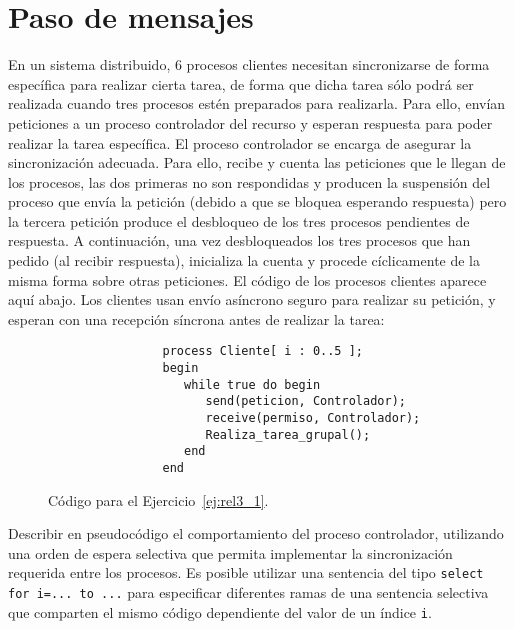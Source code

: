 \section{Paso de mensajes}

\begin{ejercicio}\label{ej:rel3_1}
    En un sistema distribuido, 6 procesos clientes necesitan sincronizarse de forma específica para realizar cierta tarea, de forma que dicha tarea sólo podrá ser realizada cuando tres procesos estén preparados para realizarla. Para ello, envían peticiones a un proceso controlador del recurso y esperan respuesta para poder realizar la tarea específica. El proceso controlador se encarga de asegurar la sincronización adecuada. Para ello, recibe y cuenta las peticiones que le llegan de los procesos, las dos primeras no son respondidas y producen la suspensión del proceso que envía la petición (debido a que se bloquea esperando respuesta) pero la tercera petición produce el desbloqueo de los tres procesos pendientes de respuesta. A continuación, una vez desbloqueados los tres procesos que han pedido (al recibir respuesta), inicializa la cuenta y procede cíclicamente de la misma forma sobre otras peticiones. El código de los procesos clientes aparece aquí abajo. Los clientes usan envío asíncrono seguro para realizar su petición, y esperan con una recepción síncrona antes de realizar la tarea:
    \begin{figure}[H]
        \centering
            \begin{verbatim}
                process Cliente[ i : 0..5 ];
                begin
                   while true do begin
                      send(peticion, Controlador);
                      receive(permiso, Controlador);
                      Realiza_tarea_grupal();
                   end
                end
            \end{verbatim}
        \caption{Código para el Ejercicio~\ref{ej:rel3_1}.}
        \label{fig:cod_1}
    \end{figure}
    Describir en pseudocódigo el comportamiento del proceso controlador, utilizando una orden de espera selectiva que permita implementar la sincronización requerida entre los procesos. Es posible utilizar una sentencia del tipo \verb|select for i=... to ...| para especificar diferentes ramas de una sentencia selectiva que comparten el mismo código dependiente del valor de un índice \verb|i|.\\


\end{ejercicio}
